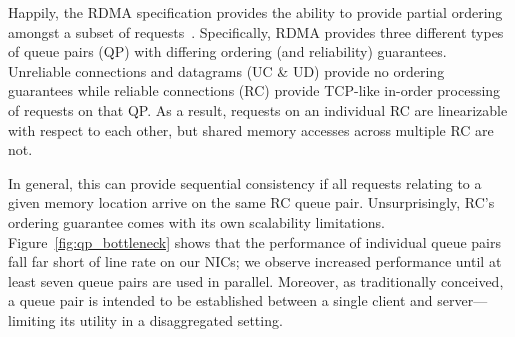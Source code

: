 Happily, the RDMA specification provides the ability to provide
partial ordering amongst a subset of requests~\cite{infiniband-spec}.
Specifically, RDMA provides three different types of queue pairs (QP)
with differing ordering (and reliability) guarantees. Unreliable
connections and datagrams (UC \& UD) provide no ordering guarantees
while reliable connections (RC) provide TCP-like in-order processing
of requests on that QP.  As a result, requests on an individual RC are
linearizable with respect to each other, but shared memory accesses
across multiple RC are not.
%
%

In general, this can provide sequential consistency if all requests
relating to a given memory location arrive on the same RC queue pair.
Unsurprisingly, RC's ordering guarantee comes with its own
scalability limitations.  Figure~\ref{fig:qp_bottleneck} shows that
the performance of individual queue pairs fall far short of line
rate on our NICs; we observe increased performance until at least
seven queue pairs are used in parallel.  Moreover, as traditionally
conceived, a queue pair is intended to be established between a single
client and server---limiting its utility in a disaggregated setting.





